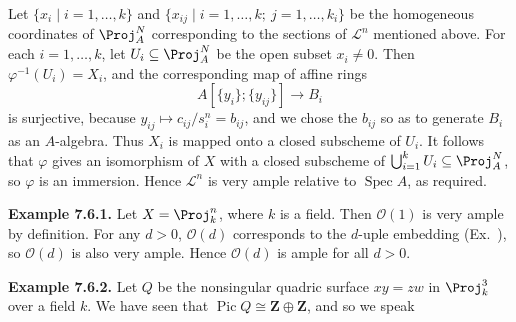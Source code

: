 {Let $\{x_i\mid i=1,\ldots,k\}$ and $\{x_{ij}\mid i=1,\ldots,k;\ j=1,\ldots,k_i\}$ be the homogeneous coordinates of $\Proj_A^N$ corresponding to the sections of $\mathcal L^n$ mentioned above. For each $i=1,\ldots,k$, let $U_i\subseteq\Proj_A^N$ be the open subset $x_i\ne0$. Then $\varphi^{-1}(U_i)=X_i$, and the corresponding map of affine rings
\[
A[\{y_i\};\{y_{ij}\}]\to B_i
\]
is surjective, because $y_{ij}\mapsto c_{ij}/s_i^n=b_{ij}$, and we chose the $b_{ij}$ so as to generate $B_i$ as an $A$-algebra. Thus $X_i$ is mapped onto a closed subscheme of $U_i$. It follows that $\varphi$ gives an isomorphism of $X$ with a closed subscheme of $\bigcup_{i=1}^kU_i\subseteq\Proj_A^N$, so $\varphi$ is an immersion. Hence $\mathcal L^n$ is very ample relative to $\operatorname{Spec}A$, as required.

\medskip
\noindent\hypertarget{result-II-7.6.1}{}\textbf{Example 7.6.1.} Let $X=\Proj_k^n$, where $k$ is a field. Then $\mathcal O(1)$ is very ample by definition. For any $d>0$, $\mathcal O(d)$ corresponds to the $d$-uple embedding (Ex.~), so $\mathcal O(d)$ is also very ample. Hence $\mathcal O(d)$ is ample for all $d>0$.

\medskip
\noindent\hypertarget{result-II-7.6.2}{}\textbf{Example 7.6.2.} Let $Q$ be the nonsingular quadric surface $xy=zw$ in $\Proj_k^3$ over a field $k$. We have seen  that $\operatorname{Pic}Q\cong\mathbf Z\oplus\mathbf Z$, and so we speak
}
